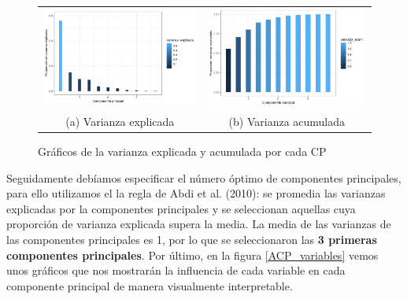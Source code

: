\documentclass[letterpaper,11pt]{article}
\begin{document}
\begin{figure}
\begin{tabular}{cc}
  \includegraphics[scale=0.4]{./img/ACP_explicada.png} &   \includegraphics[scale=0.4]{./img/ACP_acumulada.png} \\
(a) Varianza explicada & (b) Varianza acumulada \\[6pt]
\end{tabular}
\caption{Gráficos de la varianza explicada y acumulada por cada CP}
\label{ACP_grafico}
\end{figure}

Seguidamente debíamos especificar el número óptimo de componentes principales, para ello utilizamos el la regla de Abdi et al. (2010): se promedia las varianzas explicadas por la componentes principales y se seleccionan aquellas cuya proporción de varianza explicada supera la media. La media de las varianzas de las componentes principales es 1, por lo que se seleccionaron las \textbf{3 primeras componentes principales}. Por último, en la figura \ref{ACP_variables} vemos unos gráficos que nos mostrarán la influencia de cada variable en cada componente principal de manera visualmente interpretable.
\end{document}
